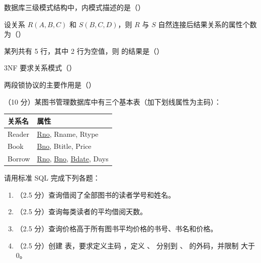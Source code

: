 \documentclass[a4paper,11pt]{article}
\begin{document}


\q 数据库三级模式结构中，内模式描述的是（\quad）

\q 设关系 $R(A,B,C)$ 和 $S(B,C,D)$，则 $R$ 与 $S$ 自然连接后结果关系的属性个数为（\quad）

\q 某列共有 5 行，其中 2 行为空值，则  的结果是（\quad）

\q 3NF 要求关系模式（\quad）

\q 两段锁协议的主要作用是（\quad）


\q （10 分）某图书管理数据库中有三个基本表（加下划线属性为主码）：
\begin{center}\small
\begin{tabular}{ll}
\toprule
关系名 & 属性 \\
\midrule
Reader & \underline{Rno}, Rname, Rtype \\
Book & \underline{Bno}, Btitle, Price \\
Borrow & \underline{Rno}, \underline{Bno}, \underline{Bdate}, Days \\
\bottomrule
\end{tabular}
\end{center}
请用标准 SQL 完成下列各题：
\begin{enumerate}[label=（\arabic*）, leftmargin=2.4em, itemsep=1pt]
  \item （2.5 分）查询借阅了全部图书的读者学号和姓名。
  \item （2.5 分）查询每类读者的平均借阅天数。
  \item （2.5 分）查询价格高于所有图书平均价格的书号、书名和价格。
  \item （2.5 分）创建  表，要求定义主码 ，定义 、 分别到 、 的外码，并限制  大于 0。
\end{enumerate}
\anslines{9cm}
\end{document}
